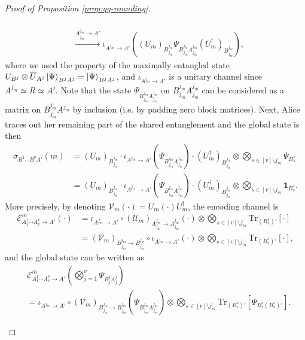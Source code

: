 \documentclass[a4paper,onecolumn,11pt,accepted=2025-10-01]{quantumarticle}
\newcommand*{\bid}{\mathbf{1}}
\newcommand*{\cE}{\mathcal{E}}
\newcommand*{\cU}{\mathcal{U}}
\newcommand*{\cV}{\mathcal{V}}
\newcommand*{\ptr}[2]{\mathrm{Tr}_{#1}\left[#2\right]}
\begin{document}
\begin{proof}[Proof of Proposition \ref{prop:qq-rounding}]
\begin{itemize}
\begin{align}
        \\&\overset{A_{j_m}^{j_m}\rightarrow A'}{\longrightarrow} \iota_{A^{j_m}\rightarrow  A'}\left((U_m)_{B_{j_m}^{j_m}}  \Psi_{B_{j_m}^{j_m}A_{j_m}^{j_m}}(U_m^\dagger)_{B_{j_m}^{j_m}}\right),
    \end{align}
    where we used the property of the maximally entangled state $U_{B^j}\otimes \overline{U}_{A^j}\ket{\Psi}_{B^jA^j} = \ket{\Psi}_{B^jA^j}$, and  $\iota_{A^{j_m} \rightarrow A'}$ is a unitary channel since $A^{j_m}\simeq R\simeq A'$. Note that the state $\Psi_{B^{j_m}_{j_m}A^{j_m}_{j_m}}$ on $B^{j_m}_{j_m}A^{j_m}_{j_m}$ can be considered as a matrix on $B^{j_m}_{j_m}A^{j_m}$ by inclusion (i.e. by padding zero block matrices).
    Next, Alice traces out her remaining part of the shared entanglement and the global state is then 
    \begin{align}
        \sigma_{B^1 \cdots B^{v} A'}(m) &=  (U_m)_{B_{j_m}^{j_m}} \cdot\iota_{A^{j_m}\rightarrow  A'}\left(\Psi_{B_{j_m}^{j_m}A_{j_m}^{j_m}}\right)\cdot(U_m^\dagger)_{B_{j_m}^{j_m}} \otimes \bigotimes_{s\in [v]\setminus j_m} \Psi_{B^s_{s}} 
        \\&=(U_m)_{B_{j_m}^{j_m}} \cdot\iota_{A^{j_m}\rightarrow  A'}\left(\Psi_{B_{j_m}^{j_m}A_{j_m}^{j_m}}\right)\cdot(U_m^\dagger)_{B_{j_m}^{j_m}} \otimes \bigotimes_{s\in [v]\setminus j_m} \bid_{B^s_{s}}.
    \end{align}
    More precisely, by denoting $\cV_m(\cdot)= U_m(\cdot)U_m^\dagger$, the encoding channel is 
    \begin{align}    \cE^m_{A_{1}^{1}\cdots A_{v}^{v}\rightarrow A'}\left(\cdot \right) &= \iota_{A^{j_m}\rightarrow  A'}\circ (\cU_m)_{A_{j_m}^{j_m}\rightarrow A_{j_m}^{j_m}}  (\cdot) \otimes \bigotimes_{s\in [v]\setminus j_m} \ptr{(B^s_{s})'}{\cdot}
    \\&= (\cV_m)_{B_{j_m}^{j_m}\rightarrow B_{j_m}^{j_m}}\circ \iota_{A^{j_m}\rightarrow  A'}   (\cdot) \otimes \bigotimes_{s\in [v]\setminus j_m} \ptr{(B^s_{s})'}{\cdot},
    \end{align}
   and the global state can be written as 
   \begin{align}
       &\cE^m_{A_{1}^{1}\cdots A_{v}^{v}\rightarrow A'}\left(\bigotimes_{j=1}^{v} \Psi_{B^j_{j} A^j_{j}}\right) 
       \\&= \iota_{A^{j_m}\rightarrow  A'}\circ (\cV_m)_{B_{j_m}^{j_m}\rightarrow B_{j_m}^{j_m}}  (\Psi_{B^{j_m}_{j_m}A^{j_m}_{j_m}}) \otimes \bigotimes_{s\in [v]\setminus j_m} \ptr{(B^s_{s})'}{\Psi_{B^s_{s}(B^s_{s})'} }.
   \end{align}

\end{itemize}
\end{proof}
\end{document}

